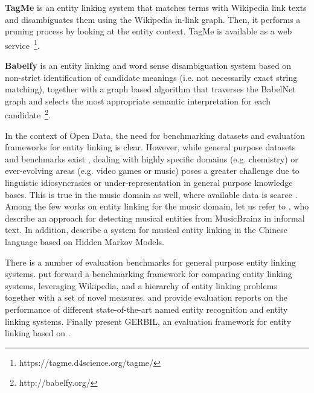 \vspace{-0.2cm}
\noindent \textbf{TagMe} \citep{Ferragina2012} is an entity linking system that matches terms with Wikipedia link texts and disambiguates them using the Wikipedia in-link graph. Then, it performs a pruning process by looking at the entity context. TagMe is available as a web service~\footnote{https://tagme.d4science.org/tagme/}.

\vspace{-0.2cm}
\noindent \textbf{Babelfy} \citep{Moroetal2014b} is an entity linking and word sense disambiguation system based on non-strict identification of candidate meanings (i.e. not necessarily exact string matching), together with a graph based algorithm that traverses the BabelNet graph and selects the most appropriate semantic interpretation for each candidate~\footnote{http://babelfy.org/}.

In the context of Open Data, the need for benchmarking datasets and evaluation frameworks for entity linking is clear. However, while general purpose datasets and benchmarks exist \citep{Usbeck2015}, dealing with highly specific domains (e.g. chemistry) or ever-evolving areas (e.g. video games or music) poses a greater challenge due to linguistic idiosyncrasies or under-representation in general purpose knowledge bases. This is true in the music domain as well, where available data is scarce \citep{Gruhl2009}.
Among the few works on entity linking for the music domain, let us refer to \cite{Gruhl2009}, who describe an approach for detecting musical entities from MusicBrainz in informal text. In addition, \cite{Zhang2009} describe a system for musical entity linking in the Chinese language based on Hidden Markov Models. %

There is a number of evaluation benchmarks for general purpose entity linking systems. \citep{Cornolti2013} put forward a benchmarking framework for comparing entity linking systems, leveraging Wikipedia, and a hierarchy of entity linking problems together with a set of novel measures. \citep{Rizzo2014} and \citep{Gangemi2013} provide evaluation reports on the performance of different state-of-the-art named entity recognition and entity linking systems. Finally \citep{Usbeck2015} present GERBIL, an evaluation framework for entity linking based on \citep{Cornolti2013}.



